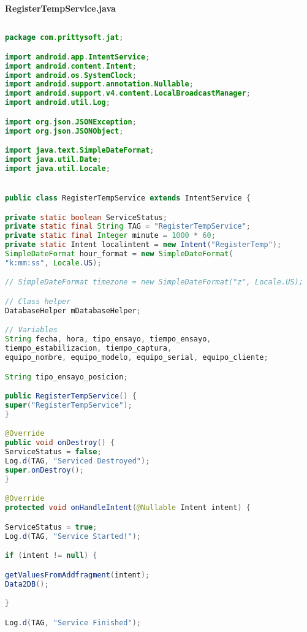 \clearpage

\centering\textbf{RegisterTempService.java}

\begin{lstlisting}[language=java, caption={Clase RegisterTempService, Valida que el usuario no haya presionado el boton cancelar y realiza inserciones y actualizaciones a la base de datos.}, captionpos=b, basicstyle=\small]

package com.prittysoft.jat;

import android.app.IntentService;
import android.content.Intent;
import android.os.SystemClock;
import android.support.annotation.Nullable;
import android.support.v4.content.LocalBroadcastManager;
import android.util.Log;

import org.json.JSONException;
import org.json.JSONObject;

import java.text.SimpleDateFormat;
import java.util.Date;
import java.util.Locale;


public class RegisterTempService extends IntentService {

private static boolean ServiceStatus;
private static final String TAG = "RegisterTempService";
private static final Integer minute = 1000 * 60;
private static Intent localintent = new Intent("RegisterTemp");
SimpleDateFormat hour_format = new SimpleDateFormat(
"k:mm:ss", Locale.US);

// SimpleDateFormat timezone = new SimpleDateFormat("z", Locale.US);

// Class helper
DatabaseHelper mDatabaseHelper;

// Variables
String fecha, hora, tipo_ensayo, tiempo_ensayo, 
tiempo_estabilizacion, tiempo_captura,
equipo_nombre, equipo_modelo, equipo_serial, equipo_cliente;

String tipo_ensayo_posicion;

public RegisterTempService() {
super("RegisterTempService");
}

@Override
public void onDestroy() {
ServiceStatus = false;
Log.d(TAG, "Serviced Destroyed");
super.onDestroy();
}

@Override
protected void onHandleIntent(@Nullable Intent intent) {

ServiceStatus = true;
Log.d(TAG, "Service Started!");

if (intent != null) {

getValuesFromAddfragment(intent);
Data2DB();

}

Log.d(TAG, "Service Finished");


\end{lstlisting}

